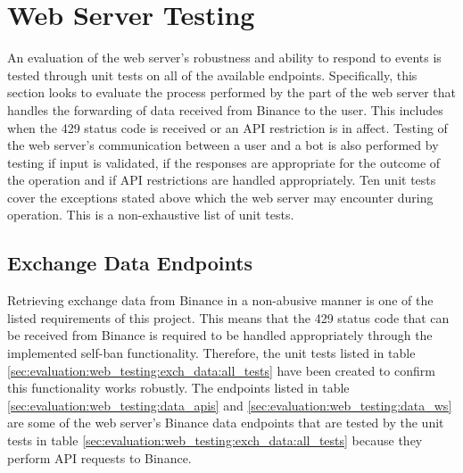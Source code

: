\section{Web Server Testing}
\label{sec:evaluation:web_server}

\noindent An evaluation of the web server's robustness and ability to respond to events is tested through unit tests on all of the available endpoints. Specifically, this section looks to evaluate the process performed by the part of the web server that handles the forwarding of data received from Binance to the user. This includes when the 429 status code is received or an API restriction is in affect. Testing of the web server's communication between a user and a bot is also performed by testing if input is validated, if the responses are appropriate for the outcome of the operation and if API restrictions are handled appropriately. Ten unit tests cover the exceptions stated above which the web server may encounter during operation. This is a non-exhaustive list of unit tests.


\subsection{Exchange Data Endpoints}
\label{sec:evaluation:web_server:exch_data}

\noindent Retrieving exchange data from Binance in a non-abusive manner is one of the listed requirements of this project. This means that the 429 status code that can be received from Binance is required to be handled appropriately through the implemented self-ban functionality. Therefore, the unit tests listed in table \ref{sec:evaluation:web_testing:exch_data:all_tests} have been created to confirm this functionality works robustly. The endpoints listed in table \ref{sec:evaluation:web_testing:data_apis} and \ref{sec:evaluation:web_testing:data_ws} are some of the web server's Binance data endpoints that are tested by the unit tests in table \ref{sec:evaluation:web_testing:exch_data:all_tests} because they perform API requests to Binance. 

